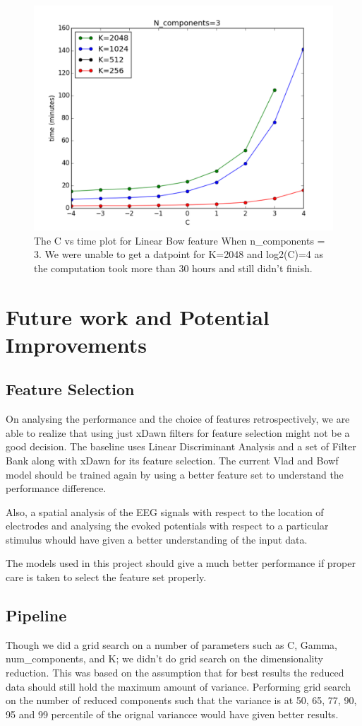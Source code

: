 \documentclass[final,leqno,onefignum,onetabnum]{siamltexmm}
\begin{document}
\begin{figure}
  \centering
  \includegraphics[width=0.60\linewidth]{images/time3Components}
  \caption{The C vs time plot for Linear Bow feature When n\_components = 3.  We were unable to get a datpoint for K=2048 and log2(C)=4 as the computation took more than 30 hours and still didn't finish.\label{fig:bowf_time3}}
\end{figure}


\section{Future work and Potential Improvements}
\subsection{Feature Selection}
  On analysing the performance and the choice of features retrospectively, we are able to realize that using just xDawn filters for feature selection might not be a good decision.  
The baseline uses Linear Discriminant Analysis and a set of Filter Bank along with xDawn for its feature selection.
The current Vlad and Bowf model should be trained again by using a better feature set to understand the performance difference.

Also, a spatial analysis of the EEG signals with respect to the location of electrodes and analysing the evoked potentials with respect to a particular stimulus whould have given a better understanding of the input data.

The models used in this project should give a much better performance if proper care is taken to select the feature set properly.

\subsection{Pipeline}
Though we did a grid search on a number of parameters such as C, Gamma, num\_components, and K\@; we didn't do grid search on the dimensionality reduction.  
This was based on the assumption that for best results the reduced data should still hold the maximum amount of variance.
Performing grid search on the number of reduced components such that the variance is at 50, 65, 77, 90, 95 and 99 percentile of the orignal variancce would have given better results.
\end{document}
